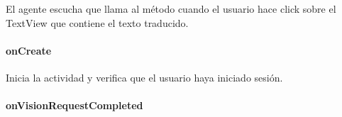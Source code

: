 \begin{fulllineitems}
\label{\detokenize{dev_docs:com.lar.cloudnao.OCRTranslationActivity.onClickTranslatedText()}}
El agente escucha que llama al método {\hyperref[\detokenize{dev_docs:com.lar.cloudnao.Robot.say(String)}]{}} cuando el usuario hace click sobre el TextView que contiene el texto traducido.

\end{fulllineitems}



\paragraph{onCreate}
\label{\detokenize{dev_docs:id24}}

\begin{fulllineitems}
\label{\detokenize{dev_docs:com.lar.cloudnao.OCRTranslationActivity.onCreate(Bundle)}}
Inicia la actividad y verifica que el usuario haya iniciado sesión.

\end{fulllineitems}



\paragraph{onVisionRequestCompleted}
\label{\detokenize{dev_docs:id25}}

